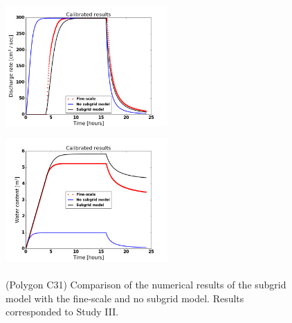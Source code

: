 \documentclass[review,11pt]{elsarticle}
\begin{document}
\begin{figure}
\centering
\includegraphics[width=6.2cm, height=5cm]{./figures/POLYGON31/POLYGON31dischargeCalibDDManning.png}
\includegraphics[width=6.2cm, height=5cm]{./figures/POLYGON31/POLYGON31watercontentCalibDDManning.png}
\caption{(Polygon C31) Comparison of the numerical results of the subgrid model with the fine-scale and no subgrid model. Results corresponded to Study III.}
\label{polygon-C31}
\end{figure}
\end{document}
